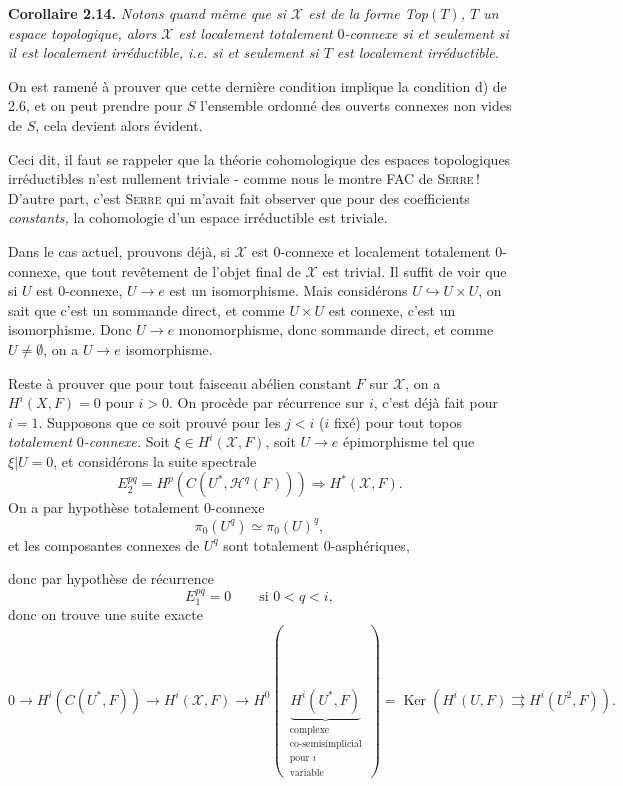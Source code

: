 \documentclass[11pt]{article}
\newcommand{\printedpage}[1]{\marginpar{\footnotesize p.~#1}}
\newcommand{\msp}[1]{\marginpar{\footnotesize [#1]}}
\newcommand{\X}{\mathscr{X}}
\newcommand{\Ker}{\operatorname{Ker}}
\begin{document}
\msp{page 30}\textbf{Corollaire 2.14.} \textit{Notons quand même que si $\X$ est de la forme Top$(T)$, $T$ un espace topologique, alors $\X$ est localement totalement} $0$\textit{-connexe si et seulement si il est localement irréductible, i.e. si et seulement si $T$ est localement irréductible.}

\printedpage{19}

On est ramené à prouver que cette dernière condition implique la condition d) de 2.6, et on peut prendre pour $S$ l'ensemble ordonné des ouverts connexes non vides de $S$, cela devient alors évident.

Ceci dit, il faut se rappeler que la théorie cohomologique des espaces topologiques irréductibles n'est nullement triviale - comme nous le montre FAC de \textsc{Serre}\,! D'autre part, c'est \textsc{Serre} qui m'avait fait observer que pour des coefficients \textit{constants,} la cohomologie d'un espace irréductible est triviale.

Dans le cas actuel, prouvons déjà, si $\mathcal{X}$ est 0-connexe et localement totalement 0-connexe, que tout revêtement de l'objet final de $\mathcal{X}$ est trivial. Il suffit de voir que si $U$ est 0-connexe, $U \longrightarrow e$ est un isomorphisme. Mais considérons $U \hookrightarrow U \times U$, on sait que c'est un sommande direct, et comme $U \times U$ est connexe, c'est un isomorphisme. Donc $U \longrightarrow e$ monomorphisme, donc sommande direct, et comme $U \neq \emptyset$, on a $U \longrightarrow e$ isomorphisme.

Reste à prouver que pour tout faisceau \msp{page 31} abélien constant $F$ sur $\mathcal{X}$, on a $H^i(X,F)=0$ pour $i>0$. On procède par récurrence sur $i$, c'est déjà fait pour $i=1$. Supposons que ce soit prouvé pour les $j<i$ ($i$ fixé) pour tout topos \textit{totalement} 0\textit{-connexe.} Soit $\xi \in H^i(\mathcal{X},F)$, soit $U \longrightarrow e$ épimorphisme tel que $\xi|U=0$, et considérons la suite spectrale %
\[
E_2^{pq} = H^p(C(U^*,\mathcal{H}^q(F))) \Longrightarrow H^*(\mathcal{X},F).
\]
On a par hypothèse totalement 0-connexe
\[
\pi_0(U^q) \simeq \pi_0(U)^q, \tag*{$(*)$}
\]
et les composantes connexes de $U^q$ sont totalement 0-asphériques,
\begin{center}
\end{center}
donc par hypothèse de récurrence
\[
E_1^{pq} = 0 \qquad \text{si } 0<q<i,
\]
donc on trouve une suite exacte
\[
0 \longrightarrow H^i(C(U^*,F)) \longrightarrow H^i(\mathcal{X},F) \longrightarrow H^0(\ \underbrace{H^i(U^*,F)}_{\substack{\text{complexe}\\ \text{co-semisimplicial}\\ \text{pour } i\\ \text{variable}}}\ ) = \Ker(H^i(U,F) \rightrightarrows H^i(U^2,F)).
\]
\end{document}
